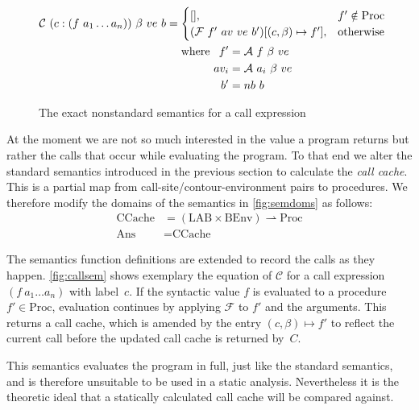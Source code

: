 \documentclass[a4paper,parskip=half,BCOR=8mm,DIV=calc,12pt]{scrbook}
\newcommand{\C}{\mathcal C}
\newcommand{\F}{\mathcal F}
\newcommand{\A}{\mathcal A}
\begin{document}
\begin{figure}
\begin{framed}
\begin{align*}
\C\ (c:(f\ a_1\ldots a_n))\ \beta\ ve\ b &= 
\begin{cases}
[], & f' \notin \text{Proc} \\
(\F\ f'\ av\ ve\ b' )[(c,\beta) \mapsto f'], &\text{otherwise}
\end{cases}\\
&\phantom{\strut=\strut}\text{where } 
\begin{aligned}[t]
f' &= \A\ f\ \beta\ ve \\
av_i &= \A\ a_i\ \beta\ ve\\
b' &= nb\ b
\end{aligned}
\end{align*}
\vspace{-1em}
\end{framed}
\caption{The exact nonstandard semantics for a call expression}
\label{fig:callsem}
\end{figure}

At the moment we are not so much interested in the value a program returns but rather the calls that occur while evaluating the program. To that end we alter the standard semantics introduced in the previous section to calculate the \textit{call cache}. This is a partial map from call-site/contour-environment pairs to procedures. We therefore modify the domains of the semantics in \vref{fig:semdoms} as follows:
\begin{align*}
\text{CCache} &= (\text{LAB}\times\text{BEnv}) \rightharpoonup \text{Proc}\\
\text{Ans} &= \text{CCache}
\end{align*}

The semantics function definitions are extended to record the calls as they happen. \vref{fig:callsem} shows exemplary the equation of $\C$ for a call expression $(f\ a_1\ldots a_n)$ with label~$c$. If the syntactic value $f$ is evaluated to a procedure $f'\in \text{Proc}$, evaluation continues by applying $\F$ to $f'$ and the arguments. This returns a call cache, which is amended by the entry $(c,\beta) \mapsto f'$ to reflect the current call before the updated call cache is returned by~$C$.

This semantics evaluates the program in full, just like the standard semantics, and is therefore unsuitable to be used in a static analysis. Nevertheless it is the theoretic ideal that a statically calculated call cache will be compared against.
\end{document}
